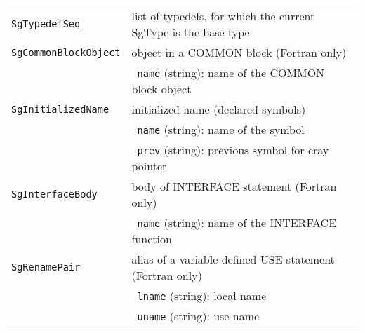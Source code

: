 \begin{longtable}[l]{l|p{10cm}}
\texttt{SgTypedefSeq}& list of typedefs, for which the current SgType is the base type\\
\texttt{SgCommonBlockObject}& object in a COMMON block (Fortran only)\\
 & ~\texttt{name} (string): name of the COMMON block object \\
\texttt{SgInitializedName}& initialized name (declared symbols)\\
 & ~\texttt{name} (string): name of the symbol \\
 & ~\texttt{prev} (string): previous symbol for cray pointer\\
\texttt{SgInterfaceBody}& body of INTERFACE statement (Fortran only)\\
 & ~\texttt{name} (string): name of the INTERFACE function \\
 \texttt{SgRenamePair}& alias of a variable defined USE statement (Fortran only)\\
 & ~\texttt{lname} (string): local name\\
 & ~\texttt{uname} (string): use name\\
\end{longtable}
